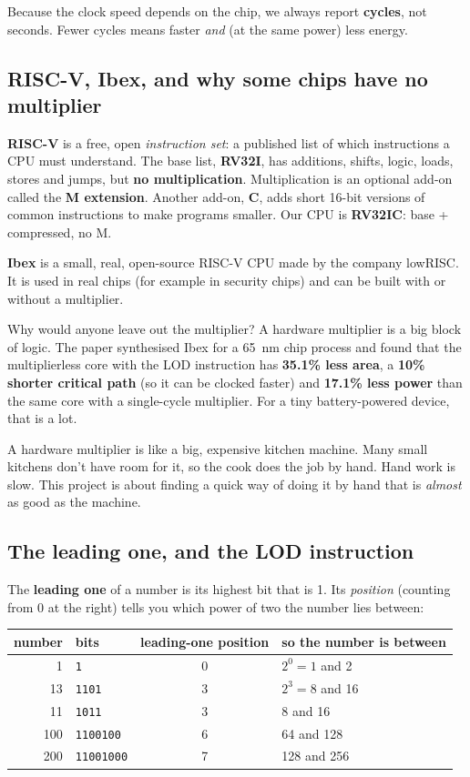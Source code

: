 Because the clock speed depends on the chip, we always report \textbf{cycles}, not seconds.
Fewer cycles means faster \emph{and} (at the same power) less energy.

\subsection{RISC-V, Ibex, and why some chips have no multiplier}

\textbf{RISC-V} is a free, open \emph{instruction set}: a published list of which instructions a CPU
must understand. The base list, \textbf{RV32I}, has additions, shifts, logic, loads, stores and
jumps, but \textbf{no multiplication}. Multiplication is an optional add-on called the
\textbf{M extension}. Another add-on, \textbf{C}, adds short 16-bit versions of common
instructions to make programs smaller. Our CPU is \textbf{RV32IC}: base + compressed, no M.

\textbf{Ibex} is a small, real, open-source RISC-V CPU made by the company lowRISC. It is used in
real chips (for example in security chips) and can be built with or without a multiplier.

Why would anyone leave out the multiplier? A hardware multiplier is a big block of logic. The
paper synthesised Ibex for a 65~nm chip process and found that the multiplierless core with
the LOD instruction has \textbf{35.1\% less area}, a \textbf{10\% shorter critical path} (so it can
be clocked faster) and \textbf{17.1\% less power} than the same core with a single-cycle
multiplier. For a tiny battery-powered device, that is a lot.

\begin{kid}
A hardware multiplier is like a big, expensive kitchen machine. Many small kitchens don't
have room for it, so the cook does the job by hand. Hand work is slow. This project is about
finding a quick way of doing it by hand that is \emph{almost} as good as the machine.
\end{kid}

\subsection{The leading one, and the LOD instruction}\label{sec:lod}

The \textbf{leading one} of a number is its highest bit that is 1. Its \emph{position} (counting
from 0 at the right) tells you which power of two the number lies between:

\begin{center}
\begin{tabular}{rlcl}
\toprule
number & bits & leading-one position & so the number is between\\
\midrule
1 & \texttt{1} & 0 & $2^0=1$ and 2\\
13 & \texttt{1101} & 3 & $2^3=8$ and 16\\
11 & \texttt{1011} & 3 & 8 and 16\\
100 & \texttt{1100100} & 6 & 64 and 128\\
200 & \texttt{11001000} & 7 & 128 and 256\\
\bottomrule
\end{tabular}
\end{center}

